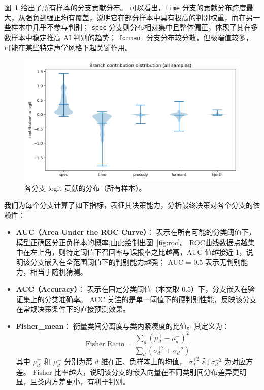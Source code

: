 \documentclass[a4paper,12pt]{article}
\begin{document}
图~\ref{fig:contrib_violin} 给出了所有样本的分支贡献分布。
可以看出，\texttt{time} 分支的贡献分布跨度最大，从强负到强正均有覆盖，说明它在部分样本中具有极高的判别权重，而在另一些样本中几乎不参与判别；
\texttt{spec} 分支则分布相对集中且整体偏正，体现了其在多数样本中稳定推高 AI 判别的趋势；
\texttt{formant} 分支分布较分散，但极端值较多，可能在某些特定声学风格下起关键作用。

\begin{figure}[H]
  \centering
  \includegraphics[width=.75\linewidth]{images_in_paper/contrib_violin_all.png}
  \caption{各分支 logit 贡献的分布（所有样本）。}
  \label{fig:contrib_violin}
\end{figure}

我们为每个分支计算了如下指标，表征其决策能力，分析最终决策对各个分支的依赖性：

\begin{itemize}
  \item \textbf{AUC（Area Under the ROC Curve）}：
  表示在所有可能的分类阈值下，模型正确区分正负样本的概率,由此绘制出图~\ref{fig:roc}。
  ROC曲线数据点越集中在左上角，则特定阈值下召回率与误报率之比越高，AUC 值越接近 1，说明该分支嵌入在全范围阈值下的判别能力越强；
  AUC = 0.5 表示无判别能力，相当于随机猜测。

  \item \textbf{ACC（Accuracy）}：
  表示在固定分类阈值（本文取 0.5）下，分支嵌入在验证集上的分类准确率。
  ACC 关注的是单一阈值下的硬判别性能，反映该分支在常规决策条件下的直接预测效果。

  \item \textbf{Fisher\_mean}：
  衡量类间分离度与类内紧凑度的比值。其定义为：
  \[
  \text{Fisher Ratio} = \frac{\sum_d (\mu_d^{+} - \mu_d^{-})^2}{\sum_d (\sigma_d^{+2} + \sigma_d^{-2})}
  \]
  其中 $\mu_d^{+}$ 和 $\mu_d^{-}$ 分别为第 $d$ 维在正、负样本上的均值，
  $\sigma_d^{+2}$ 和 $\sigma_d^{-2}$ 为对应方差。
  Fisher 比率越大，说明该分支的嵌入向量在不同类别间分布差异更明显，且类内方差更小，有利于判别。

\end{itemize}
\end{document}
